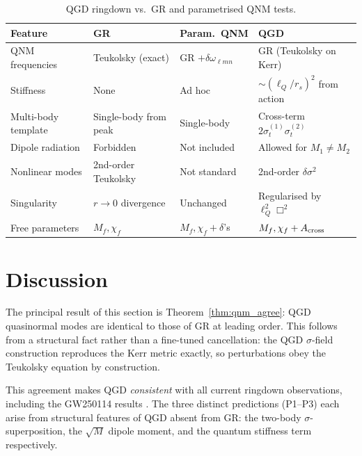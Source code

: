 \documentclass[11pt,a4paper]{article}
\theoremstyle{definition}
\theoremstyle{remark}
\newcommand{\sig}[2]{\sigma_{#1}^{(#2)}}
\newcommand{\lQ}{\ell_{Q}}
\begin{document}
	\begin{table}[ht]
		\centering
		\caption{QGD ringdown vs.\ GR and parametrised QNM tests.}
		\label{tab:comparison}
		\renewcommand{\arraystretch}{1.5}
		\begin{tabular}{p{3.5cm}p{3.5cm}p{3.5cm}p{3.5cm}}
			\toprule
			Feature & GR & Param.\ QNM & QGD \\
			\midrule
			QNM frequencies   & Teukolsky (exact)
			& GR $+\delta\omega_{\ell mn}$
			& GR (Teukolsky on Kerr) \\[4pt]
			Stiffness         & None
			& Ad hoc
			& $\sim(\lQ/r_s)^2$ from action \\[4pt]
			Multi-body template & Single-body from peak
			& Single-body
			& Cross-term $2\sig{t}{1}\sig{t}{2}$ \\[4pt]
			Dipole radiation  & Forbidden
			& Not included
			& Allowed for $M_1\neq M_2$ \\[4pt]
			Nonlinear modes   & 2nd-order Teukolsky
			& Not standard
			& 2nd-order $\delta\sigma^2$ \\[4pt]
			Singularity       & $r\to0$ divergence
			& Unchanged
			& Regularised by $\lQ^2\Box^2$ \\[4pt]
			Free parameters   & $M_f,\chi_f$
			& $M_f,\chi_f+\delta$'s
			& $M_f,\chi_f+A_{\rm cross}$ \\
			\bottomrule
		\end{tabular}
	\end{table}
	
	\section{Discussion}
	\label{sec:discussion}
	
	The principal result of this section is Theorem~\ref{thm:qnm_agree}:
	QGD quasinormal modes are identical to those of GR at leading order.
	This follows from a structural fact rather than a fine-tuned cancellation:
	the QGD $\sigma$-field construction reproduces the Kerr metric exactly,
	so perturbations obey the Teukolsky equation by construction.
	
	This agreement makes QGD \emph{consistent} with all current ringdown
	observations, including the GW250114 results \cite{LVK2025}.  The
	three distinct predictions (P1--P3) each arise from structural features
	of QGD absent from GR: the two-body $\sigma$-superposition, the
	$\sqrt{M}$ dipole moment, and the quantum stiffness term respectively.
	
\end{document}

